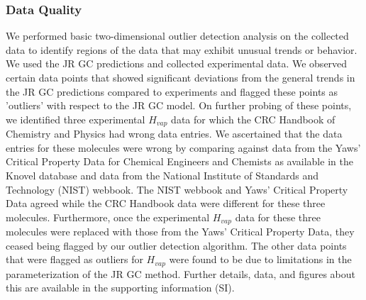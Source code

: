 \documentclass[journal=jacsat,manuscript=article]{achemso}
\begin{document}
\subsubsection{Data Quality}
We performed basic two-dimensional outlier detection analysis on the collected data to identify regions of the data that may exhibit unusual trends or behavior. We used the JR GC predictions and collected experimental data. We observed certain data points that showed significant deviations from the general trends in the JR GC predictions compared to experiments and flagged these points as 'outliers' with respect to the JR GC model. On further probing of these points, we identified three experimental $H_{vap}$ data for which the CRC Handbook of Chemistry and Physics had wrong data entries. We ascertained that the data entries for these molecules were wrong by comparing against data from the Yaws' Critical Property Data for Chemical Engineers and Chemists as available in the Knovel database and data from the National Institute of Standards and Technology (NIST) webbook. The NIST webbook and Yaws' Critical Property Data agreed while the CRC Handbook data were different for these three molecules. Furthermore, once the experimental $H_{vap}$ data for these three molecules were replaced with those from the Yaws' Critical Property Data, they ceased being flagged by our outlier detection algorithm. The other data points that were flagged as outliers for $H_{vap}$ were found to be due to limitations in the parameterization of the JR GC method. Further details, data, and figures about this are available in the supporting information (SI). 
\end{document}
